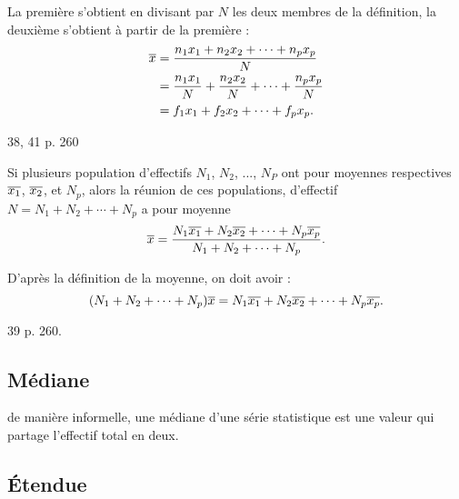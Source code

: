 \documentclass[a4paper,11pt,DIV12,BCOR0mm]{scrartcl}
\begin{document}
\begin{demonstration}
 La première s'obtient en divisant par $N$ les deux membres de la définition, la deuxième s'obtient
à partir de la première :
\begin{align*}
 \overline{x}&=\dfrac{n_1x_1+n_2x_2+\cdots+n_px_p}{N}\\
	  &=\frac{n_1x_1}{N}+\frac{n_2x_2}{N}+\cdots+\frac{n_px_p}{N}\\
	  &=f_1x_1+f_2x_2+\cdots+f_px_p.
\end{align*}
\end{demonstration}

\begin{exercice}
38, 41 p. 260
\end{exercice}


\begin{theoreme}
 Si plusieurs population d'effectifs $N_1$, $N_2$, ..., $N_P$ ont pour moyennes
respectives $\overline{x_1}$, $\overline{x_2}$, et $N_p$, alors 
la réunion de ces populations, d'effectif $N=N_1+N_2+\cdots+N_p$
a pour moyenne
\[
 \overline{x}=\dfrac{N_1\overline{x_1}+N_2\overline{x_2}+\cdots+N_p\overline{x_p}}{N_1+N_2+\cdots+N_p}.
\]
\end{theoreme}
\begin{demonstration}
 D'après la définition de la moyenne, on doit avoir :
\[
(N_1+N_2+\cdots+N_p)\overline{x}=N_1\overline{x_1}+N_2\overline{x_2}+\cdots+N_p\overline{x_p}.
\]
\end{demonstration}

\begin{exercice}
 39 p. 260.
\end{exercice}

\subsection{Médiane}
de manière informelle, une médiane d'une série statistique est une valeur qui partage l'effectif total
en deux.


\subsection{Étendue}
\end{document}
